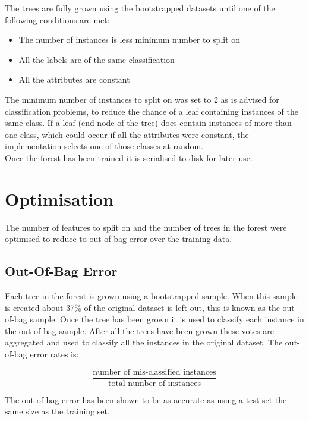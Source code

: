 	The trees are fully grown using the bootstrapped datasets until one of the following conditions are met:
		
		\begin{itemize}
			\item The number of instances is less minimum number to split on
			\item All the labels are of the same classification
			\item All the attributes are constant
		\end{itemize}
		
		The minimum number of instances to split on was set to 2 as is advised for classification problems, to reduce the chance of a leaf containing instances of the same class. If a leaf (end node of the tree) does contain instances of more than one class, which could occur if all the attributes were constant, the implementation selects one of those classes at random.\\
		
		Once the forest has been trained it is serialised to disk for later use.
	\section{Optimisation}
		The number of features to split on and the number of trees in the forest were optimised to reduce to out-of-bag error over the training data.
		
		\subsection{Out-Of-Bag Error}
			Each tree in the forest is grown using a bootstrapped sample. When this sample is created about 37\% of the original dataset is left-out, this is known as the out-of-bag sample. Once the tree has been grown it is used to classify each instance in the out-of-bag sample. After all the trees have been grown these votes are aggregated and used to classify all the instances in the original dataset. The out-of-bag error rates is:
	
				$$\frac{\text{number of mis-classified instances}}{\text{total number of instances}}$$ 

The out-of-bag error has been shown to be as accurate as using a test set the same size as the training set\cite{breiman1996out}.\\ 

